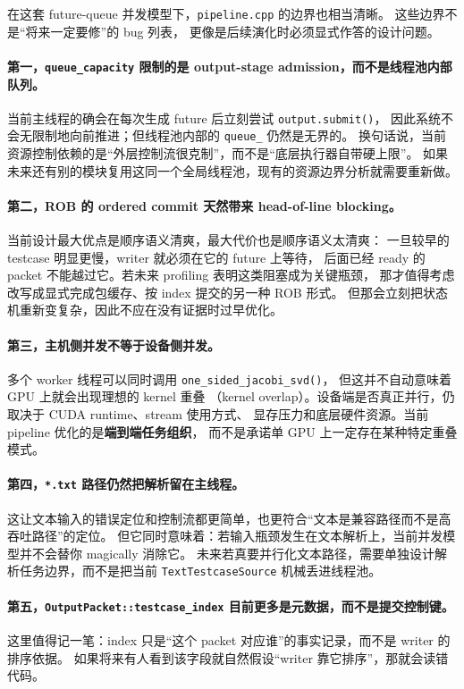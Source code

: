 在这套 future-queue 并发模型下，\texttt{pipeline.cpp} 的边界也相当清晰。
这些边界不是“将来一定要修”的 bug 列表，
更像是后续演化时必须显式作答的设计问题。

\paragraph{第一，\texttt{queue\_capacity} 限制的是 output-stage admission，而不是线程池内部队列。}
当前主线程的确会在每次生成 future 后立刻尝试 \texttt{output.submit()}，
因此系统不会无限制地向前推进；但线程池内部的 \texttt{queue\_} 仍然是无界的。
换句话说，当前资源控制依赖的是“外层控制流很克制”，而不是“底层执行器自带硬上限”。
如果未来还有别的模块复用这同一个全局线程池，现有的资源边界分析就需要重新做。

\paragraph{第二，ROB 的 ordered commit 天然带来 head-of-line blocking。}
当前设计最大优点是顺序语义清爽，最大代价也是顺序语义太清爽：
一旦较早的 testcase 明显更慢，writer 就必须在它的 future 上等待，
后面已经 ready 的 packet 不能越过它。若未来 profiling 表明这类阻塞成为关键瓶颈，
那才值得考虑改写成显式完成包缓存、按 index 提交的另一种 ROB 形式。
但那会立刻把状态机重新变复杂，因此不应在没有证据时过早优化。

\paragraph{第三，主机侧并发不等于设备侧并发。}
多个 worker 线程可以同时调用 \texttt{one\_sided\_jacobi\_svd()}，
但这并不自动意味着 GPU 上就会出现理想的 kernel 重叠
（kernel overlap）。设备端是否真正并行，仍取决于 CUDA runtime、stream 使用方式、
显存压力和底层硬件资源。当前 pipeline 优化的是\textbf{端到端任务组织}，
而不是承诺单 GPU 上一定存在某种特定重叠模式。

\paragraph{第四，\texttt{*.txt} 路径仍然把解析留在主线程。}
这让文本输入的错误定位和控制流都更简单，也更符合“文本是兼容路径而不是高吞吐路径”的定位。
但它同时意味着：若输入瓶颈发生在文本解析上，当前并发模型并不会替你 magically 消除它。
未来若真要并行化文本路径，需要单独设计解析任务边界，而不是把当前 \texttt{TextTestcaseSource} 机械丢进线程池。

\paragraph{第五，\texttt{OutputPacket::testcase\_index} 目前更多是元数据，而不是提交控制键。}
这里值得记一笔：index 只是“这个 packet 对应谁”的事实记录，而不是 writer 的排序依据。
如果将来有人看到该字段就自然假设“writer 靠它排序”，那就会读错代码。

